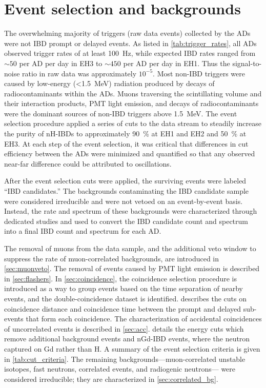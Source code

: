 \chapter{Event selection and backgrounds}
\label{ch:event_selection}

The overwhelming majority of triggers (raw data events) collected by the ADs
were not IBD prompt or delayed events.
As listed in \cref{tab:trigger_rates}, all ADs observed trigger rates
of at least \SI{100}{\Hz},
while expected IBD rates ranged from ${\sim}50$ per AD per day in EH3
to ${\sim}450$ per AD per day in EH1.
Thus the signal-to-noise ratio in raw data was approximately $10^{-5}$.
Most non-IBD triggers were caused by low-energy (\SI{<1.5}{\MeV}) radiation
produced by decays of radiocontaminants within the ADs.
Muons traversing the scintillating volume and their interaction products,
PMT light emission,
and decays of radiocontaminants
were the dominant sources of non-IBD triggers above \SI{1.5}{\MeV}.
The event selection procedure applied a series of cuts to the data stream
to steadily increase the purity of nH-IBDs
to approximately \SI{90}{\percent} at EH1 and EH2
and \SI{50}{\percent} at EH3.
At each step of the event selection, it was critical that
differences in cut efficiency between the ADs were
minimized and quantified so that any observed near-far difference
could be attributed to \nuebar{} oscillations.

After the event selection cuts were applied,
the surviving events were labeled ``IBD candidates.''
The backgrounds contaminating the IBD candidate sample
were considered irreducible and were not vetoed on an event-by-event basis.
Instead, the rate and spectrum of these backgrounds were characterized
through dedicated studies
and used to convert the IBD candidate count and spectrum
into a final IBD count and spectrum for each AD.

The removal of muons from the data sample, and the additional veto window
to suppress the rate of muon-correlated backgrounds,
are introduced in \cref{sec:muonveto}.
The removal of events caused by PMT light emission
is described in \cref{sec:flashers}.
In \cref{sec:coincidence}, the coincidence selection procedure
is introduced as a way to group events based on
the time separation of nearby events,
and the double-coincidence dataset is identified.
 describes the cuts on coincidence distance and coincidence time
between the prompt and delayed sub-events that form each coincidence.
The characterization of
accidental coincidences of uncorrelated events
is described in \cref{sec:acc}.
 details the energy cuts
which remove additional background events
and nGd-IBD events, where the neutron captured on Gd rather than H.
A summary of the event selection criteria is given in \cref{tab:cut_criteria}.
The remaining backgrounds---muon-correlated unstable isotopes,
fast neutrons, \amc{} correlated events, and radiogenic neutrons---%
were considered irreducible;
they are characterized in \cref{sec:correlated_bg}.

